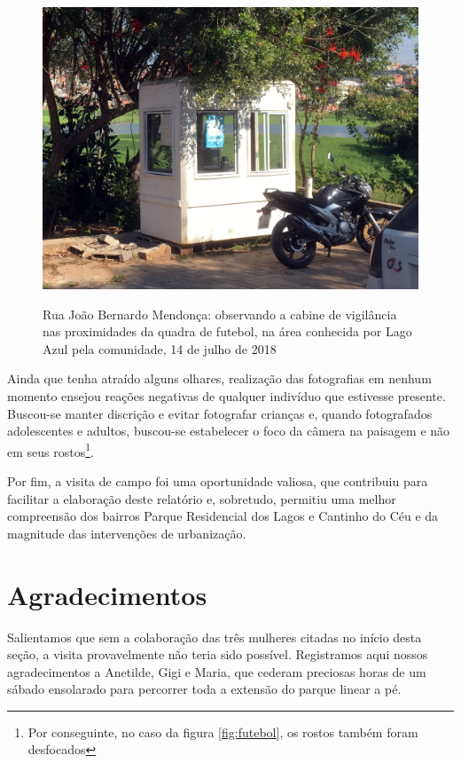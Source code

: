 	\begin{figure}[htb]
		\centering
		\caption[Cabine de vigilância em 14/07/2018]{Rua João Bernardo Mendonça: observando a cabine de vigilância nas proximidades da quadra de futebol, na área conhecida por Lago Azul pela comunidade, 14 de julho de 2018}
		\includegraphics[width=\linewidth]{img/visita_vigilancia}
		\label{fig:vigilancia}
	\end{figure}
	
	Ainda que tenha atraído alguns olhares, realização das fotografias em nenhum momento ensejou reações negativas de qualquer indivíduo que estivesse presente. Buscou-se manter discrição e evitar fotografar crianças e, quando fotografados adolescentes e adultos, buscou-se estabelecer o foco da câmera na paisagem e não em seus rostos\footnote{Por conseguinte, no caso da figura \ref{fig:futebol}, os rostos também foram desfocados}.
	
	Por fim, a visita de campo foi uma oportunidade valiosa, que contribuiu para facilitar a elaboração deste relatório e, sobretudo, permitiu uma melhor compreensão dos bairros Parque Residencial dos Lagos e Cantinho do Céu e da magnitude das intervenções de urbanização.
	
	\section{Agradecimentos}
	
	Salientamos que sem a colaboração das três mulheres citadas no início desta seção, a visita provavelmente não teria sido possível. Registramos aqui nossos agradecimentos a Anetilde, Gigi e Maria, que cederam preciosas horas de um sábado ensolarado para percorrer toda a extensão do parque linear a pé.
	
